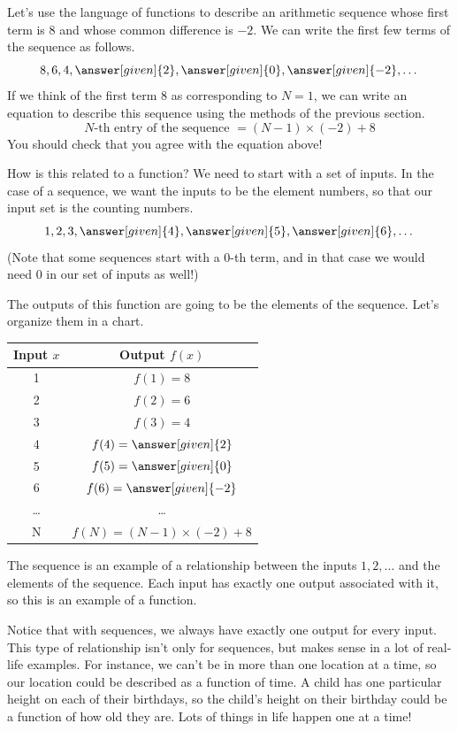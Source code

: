 \documentclass{ximera}
\begin{document}
\begin{example}
Let's use the language of functions to describe an arithmetic sequence whose first term is $8$ and whose common difference is $-2$. We can write the first few terms of the sequence as follows.
\[
8, 6, 4, \answer[given]{2}, \answer[given]{0}, \answer[given]{-2}, \dots
\]
If we think of the first term $8$ as corresponding to $N=1$, we can write an equation to describe this sequence using the methods of the previous section.
\[
N\textrm{-th entry of the sequence } = (N-1)\times(-2) + 8
\]
You should check that you agree with the equation above!

How is this related to a function? We need to start with a set of inputs. In the case of a sequence, we want the inputs to be the element numbers, so that our input set is the counting numbers.
\[
1, 2, 3, \answer[given]{4}, \answer[given]{5}, \answer[given]{6}, \dots
\]
(Note that some sequences start with a $0$-th term, and in that case we would need $0$ in our set of inputs as well!)

The outputs of this function are going to be the elements of the sequence. Let's organize them in a chart.
\begin{image}
\begin{tabular}{c|c}
Input $x$ & Output $f(x)$ \\ \hline
1 & $f(1) = 8$ \\ \hline
2 & $f(2) = 6$ \\ \hline
3 & $f(3) = 4$ \\ \hline
4 & $f(4) = \answer[given]{2}$ \\ \hline
5 & $f(5) = \answer[given]{0}$ \\ \hline
6 & $f(6) = \answer[given]{-2}$ \\ \hline
\dots & \dots \\ \hline
N & $f(N) = (N-1) \times (-2) + 8$ \\ \hline
\end{tabular}
\end{image}
The sequence is an example of a relationship between the inputs $1, 2, \dots$ and the elements of the sequence. Each input has exactly one output associated with it, so this is an example of a function.
\end{example}

Notice that with sequences, we always have exactly one output for every input. This type of relationship isn't only for sequences, but makes sense in a lot of real-life examples. For instance, we can't be in more than one location at a time, so our location could be described as a function of time. A child has one particular height on each of their birthdays, so the child's height on their birthday could be a function of how old they are. Lots of things in life happen one at a time!
\end{document}
